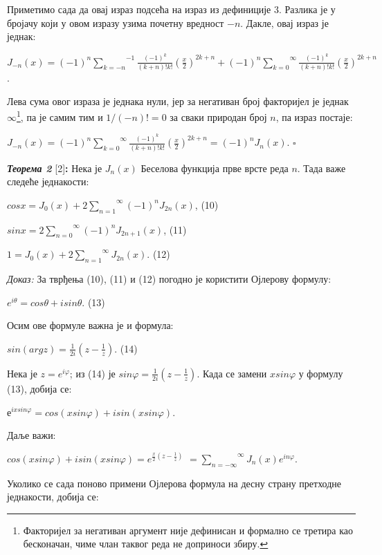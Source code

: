 Приметимо сада да овај израз подсећа на израз из дефиниције 3. Разлика
је у бројачу који у овом изразу узима почетну вредност \(- n\). Дакле,
овај израз је једнак:

\(J_{- n}(x) = {( - 1)}^{n}\overset{- 1}{\sum_{k = - n}}\frac{{( - 1)}^{k}}{(k + n)!k!}\left( \frac{x}{2} \right)^{2k + n} + {( - 1)}^{n}\overset{\infty}{\sum_{k = 0}}\frac{{( - 1)}^{k}}{(k + n)!k!}\left( \frac{x}{2} \right)^{2k + n}\).

Лева сума овог израза је једнака нули, јер за негативан број факторијел
је једнак \(\infty\)\footnote{Факторијел за негативан аргумент није
  дефинисан и формално се третира као бесконачан, чиме члан таквог реда
  не доприноси збиру.}, па је самим тим и \(1/( - n)! = 0\) за сваки
природан број \(n\), па израз постаје:

\(J_{- n}(x) = {( - 1)}^{n}\overset{\infty}{\sum_{k = 0}}\frac{{( - 1)}^{k}}{(k + n)!k!}\left( \frac{x}{2} \right)^{2k + n}{= ( - 1)}^{n}J_{n}(x)\).
\(\square\)

\emph{\textbf{Теорема 2}} {[}2{]}\textbf{:} Нека је \(J_{n}(x)\)
Беселова функција прве врсте реда \(n\). Тада важе следеће једнакости:

\(cosx = J_{0}(x) + 2\overset{\infty}{\sum_{n = 1}}{( - 1)}^{n}J_{2n}(x)\),
(10)

\(sinx = 2\overset{\infty}{\sum_{n = 0}}{( - 1)}^{n}J_{2n + 1}(x)\),
(11)

\(1 = J_{0}(x) + 2\overset{\infty}{\sum_{n = 1}}J_{2n}(x)\). (12)

\emph{Доказ:} За тврђења (10), (11) и (12) погодно је користити Ојлерову
формулу:

\(e^{i\theta} = cos\theta + isin\theta\). (13)

Осим ове формуле важна је и формула:

\(\overset{}{sin(argz)} = \frac{1}{2i}\left( z - \frac{1}{z} \right)\).
(14)

Нека је \(z = e^{i\varphi}\); из (14) је
\(sin\varphi = \frac{1}{2i}\left( z - \frac{1}{z} \right)\). Када се
замени \(xsin\varphi\) у формулу (13), добија се:

\(е^{ixsin\varphi} = cos(xsin\varphi) + isin(xsin\varphi)\).

Даље важи:

\(cos(xsin\varphi) + isin(xsin\varphi) = e^{\frac{x}{2}(z - \frac{1}{z})}\)
\(= \overset{\infty}{\sum_{n = - \infty}}J_{n}(x)e^{in\varphi}\).

Уколико се сада поново примени Ојлерова формула на десну страну
претходне једнакости, добија се:

